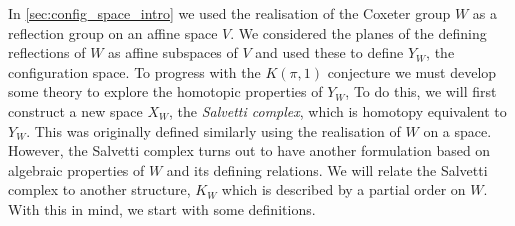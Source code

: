 \documentclass[class=article, crop=false]{standalone}
\begin{document}
In \cref{sec:config_space_intro} we used the realisation of the Coxeter group $W$ as a reflection group on an affine space $V$. We considered the planes of the defining reflections of $W$ as affine subspaces of $V$ and used these to define $Y_W$, the configuration space. To progress with the $K(\pi,1 )$ conjecture we must develop some theory to explore the homotopic properties of $Y_W$, To do this, we will first construct a new space $X_W$, the \emph{Salvetti complex}, which is homotopy equivalent to $Y_W$. This was originally defined \cite{salvetti_topology_1987, salvetti_homotopy_1994} similarly using the realisation of $W$ on a space. However, the Salvetti complex turns out to have another formulation based on algebraic properties of $W$ and its defining relations. We will relate the Salvetti complex to another structure, $K_W$ which is described by a partial order on $W$. With this in mind, we start with some definitions. 
\end{document}

